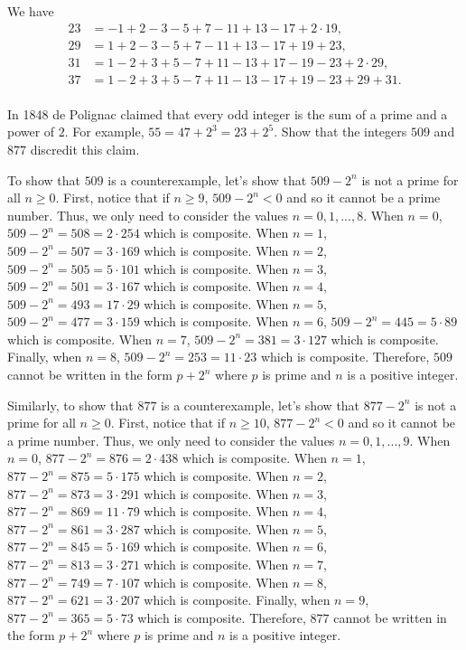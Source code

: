 \begin{solution}
    We have
    \begin{align*}
        23 &= -1 + 2 - 3 -5 + 7 - 11 + 13 - 17 + 2\cdot 19, \\
        29 &= 1 + 2 - 3 - 5 + 7 - 11 + 13 - 17 + 19 + 23,\\
        31 &= 1 - 2 + 3 + 5 - 7 + 11 - 13 + 17 - 19 - 23 + 2\cdot 29,\\
        37 &= 1 - 2 + 3 + 5 - 7 + 11 - 13 - 17 + 19 - 23 + 29 + 31.\\
    \end{align*}
\end{solution}

\begin{exercise}
    In 1848 de Polignac claimed that every odd integer is the sum of a prime and a power of $2$. For example, $55 = 47 + 2^3 = 23 + 2^5$. Show that the integers $509$ and $877$ discredit this claim. \\
\end{exercise}

\begin{solution}
    To show that $509$ is a counterexample, let's show that $509 - 2^n$ is not a prime for all $n \geq 0$. First, notice that if $n \geq 9$, $509 - 2^n < 0$ and so it cannot be a prime number. Thus, we only need to consider the values $n = 0,1, ..., 8$. When $n = 0$, $509 - 2^n = 508 = 2\cdot 254$ which is composite. When $n = 1$, $509 - 2^n = 507 = 3\cdot 169$ which is composite. When $n = 2$, $509 - 2^n = 505 = 5\cdot 101$ which is composite. When $n = 3$, $509 - 2^n = 501 = 3\cdot 167$ which is composite. When $n = 4$, $509 - 2^n = 493 = 17 \cdot 29$ which is composite. When $n = 5$, $509 - 2^n = 477 = 3\cdot 159$ which is composite. When $n = 6$, $509 - 2^n = 445 = 5\cdot 89$ which is composite. When $n = 7$, $509 - 2^n = 381 = 3\cdot 127$ which is composite. Finally, when $n = 8$, $509 - 2^n = 253 = 11\cdot 23$ which is composite. Therefore, $509$ cannot be written in the form $p + 2^n$ where $p$ is prime and $n$ is a positive integer.
    
    Similarly, to show that $877$ is a counterexample, let's show that $877 - 2^n$ is not a prime for all $n \geq 0$. First, notice that if $n \geq 10$, $877 - 2^n < 0$ and so it cannot be a prime number. Thus, we only need to consider the values $n = 0,1, ..., 9$. When $n = 0$, $877 - 2^n = 876 = 2\cdot 438$ which is composite. When $n = 1$, $877 - 2^n = 875 = 5\cdot 175$ which is composite. When $n = 2$, $877 - 2^n = 873 = 3\cdot 291$ which is composite. When $n = 3$, $877 - 2^n = 869 = 11\cdot 79$ which is composite. When $n = 4$, $877 - 2^n = 861 = 3\cdot 287$ which is composite. When $n = 5$, $877 - 2^n = 845 = 5\cdot 169$ which is composite. When $n = 6$, $877 - 2^n = 813 = 3\cdot 271$ which is composite. When $n = 7$, $877 - 2^n = 749 = 7\cdot 107$ which is composite. When $n = 8$, $877 - 2^n = 621 = 3\cdot 207$ which is composite. Finally, when $n = 9$, $877 - 2^n = 365 = 5\cdot 73$ which is composite. Therefore, $877$ cannot be written in the form $p + 2^n$ where $p$ is prime and $n$ is a positive integer. \\
\end{solution}

